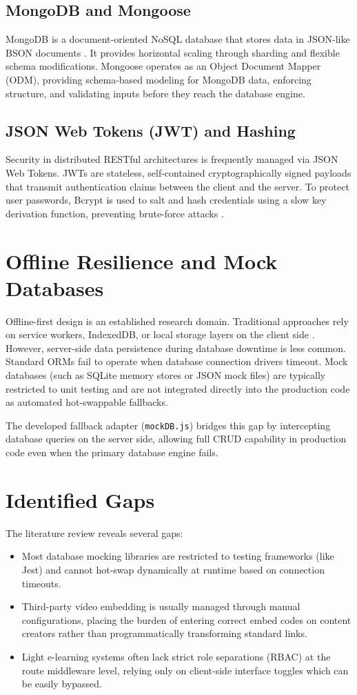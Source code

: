 \documentclass[12pt,a4paper]{report}
\begin{document}
\subsection{MongoDB and Mongoose}
MongoDB is a document-oriented NoSQL database that stores data in JSON-like BSON documents \cite{ref12}. It provides horizontal scaling through sharding and flexible schema modifications. Mongoose operates as an Object Document Mapper (ODM), providing schema-based modeling for MongoDB data, enforcing structure, and validating inputs before they reach the database engine.

\subsection{JSON Web Tokens (JWT) and Hashing}
Security in distributed RESTful architectures is frequently managed via JSON Web Tokens. JWTs are stateless, self-contained cryptographically signed payloads that transmit authentication claims between the client and the server. To protect user passwords, Bcrypt is used to salt and hash credentials using a slow key derivation function, preventing brute-force attacks \cite{ref13}.

\section{Offline Resilience and Mock Databases}
Offline-first design is an established research domain. Traditional approaches rely on service workers, IndexedDB, or local storage layers on the client side \cite{ref8}. However, server-side data persistence during database downtime is less common. Standard ORMs fail to operate when database connection drivers timeout. Mock databases (such as SQLite memory stores or JSON mock files) are typically restricted to unit testing and are not integrated directly into the production code as automated hot-swappable fallbacks. 

The developed fallback adapter (\texttt{mockDB.js}) bridges this gap by intercepting database queries on the server side, allowing full CRUD capability in production code even when the primary database engine fails.

\section{Identified Gaps}
The literature review reveals several gaps:
\begin{itemize}
    \item Most database mocking libraries are restricted to testing frameworks (like Jest) and cannot hot-swap dynamically at runtime based on connection timeouts.
    \item Third-party video embedding is usually managed through manual configurations, placing the burden of entering correct embed codes on content creators rather than programmatically transforming standard links.
    \item Light e-learning systems often lack strict role separations (RBAC) at the route middleware level, relying only on client-side interface toggles which can be easily bypassed.
\end{itemize}
\end{document}
